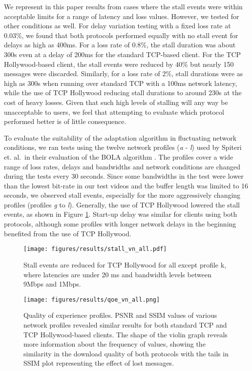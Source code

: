 We represent in this paper results from cases where the stall events were within
acceptable limits for a range of latency and loss values. However, we tested for other
conditions as well. For delay variation testing with a fixed loss rate at 0.03\%, we found
that both protocols performed equally with no stall event for delays as high as 400ms. For
a loss rate of 0.8\%, the stall duration was about 300s even at a delay of 200ms for the
standard TCP-based client. For the TCP Hollywood-based client, the stall events were reduced 
by 40\% but nearly 150
messages were discarded. Similarly, for a loss rate of 2\%, stall durations were as high as
300s when running over standard TCP with a 100ms network latency, while the use of 
TCP Hollywood reducing stall durations 
to around 230s at the cost of heavy losses. Given that such high levels of stalling will
any way be unacceptable to users, we feel that attempting to evaluate which protocol
performed better is of little consequence.

To evaluate the suitability of the adaptation algorithm in fluctuating network conditions,
we ran tests using the twelve network profiles (\emph{a} - \emph{l}) used by Spiteri et.
al.\ in their evaluation of the BOLA algorithm \cite{spiteri2016bola}. The profiles cover a
wide range of loss rates, delays and bandwidths and network conditions are changed during
the tests every 30 seconds. Since some bandwidths in the test were lower than the lowest
bit-rate in our test videos and the buffer length was limited to 16 seconds, we observed
stall events, especially for the more aggressively changing profiles (profiles \emph{g} to
\emph{l}). Generally, the use of TCP Hollywood lowered the stall events, as shown in Figure
\ref{fig:stall_profiles}. Start-up delay was similar for clients using both protocols,
although some profiles with longer network delays in the beginning benefited from the use of TCP
Hollywood. 

\begin{figure}
  \centering
  \texttt{[image: figures/results/stall\_vn\_all.pdf]}
  \caption{Stall events are reduced for TCP Hollywood for all except profile k, where 
           latencies are under 20 ms and bandwidth levels between 9Mbps and 1Mbps. }
  \label{fig:stall_profiles}
\end{figure}

\begin{figure}
  \centering
  \texttt{[image: figures/results/qoe\_vn\_all.png]}
  \caption{Quality of experience profiles. PSNR and SSIM values of various network profiles 
           revealed similar results for both standard TCP and TCP Hollywood-based clients. The 
           shape of the violin graph reveals more information about the frequency of values, 
           showing the similarity in the download quality of both protocols with the tails in 
           SSIM plot representing the effect of lost messages.}
  \label{fig:qoe_profiles}
\end{figure}

